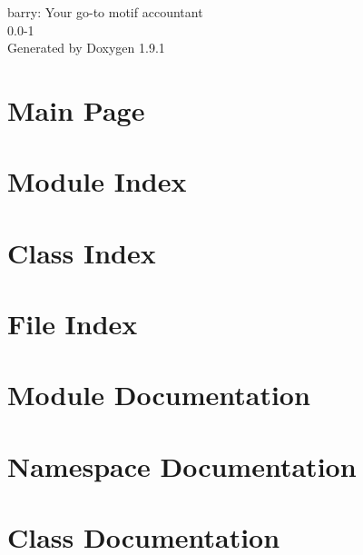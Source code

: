 \let\mypdfximage\pdfximage\def\pdfximage{\immediate\mypdfximage}\documentclass[twoside]{book}
\newcommand{\+}{\discretionary{\mbox{\scriptsize$\hookleftarrow$}}{}{}}
\newcommand{\clearemptydoublepage}{%
  \newpage{\pagestyle{empty}\cleardoublepage}%
}
\begin{document}
\raggedbottom

\hypersetup{pageanchor=false,
             bookmarksnumbered=true,
             pdfencoding=unicode
            }
\begin{titlepage}
\vspace*{7cm}
\begin{center}%
{\Large barry\+: Your go-\/to motif accountant \\[1ex]\large 0.\+0-\/1 }\\
\vspace*{1cm}
{\large Generated by Doxygen 1.9.1}\\
\end{center}
\end{titlepage}
\clearemptydoublepage
{}
\tableofcontents
\clearemptydoublepage
{}
\hypersetup{pageanchor=true}

\chapter{Main Page}
\label{index}\hypertarget{index}{}
\chapter{Module Index}

\chapter{Class Index}

\chapter{File Index}

\chapter{Module Documentation}




\chapter{Namespace Documentation}






\chapter{Class Documentation}
























\end{document}
